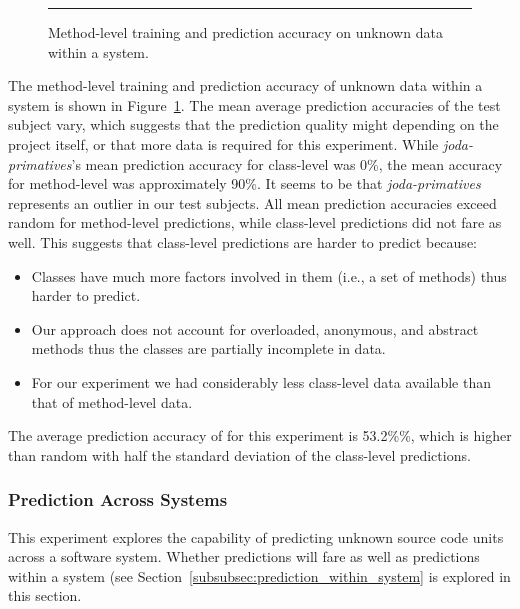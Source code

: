 \begin{figure}[!tb]
  \centering
  \begin{adjustbox}{max size={\textwidth}{\textheight}}
    
  \end{adjustbox}
  \caption{Method-level training and prediction accuracy on unknown data within a system.}
  \vspace{2mm}
  \hrule
  \label{fig:prediction_method_within_graph}
\end{figure}

The method-level training and prediction accuracy of unknown data within a system is shown in Figure~\ref{fig:prediction_method_within_graph}. The mean average prediction accuracies of the test subject vary, which suggests that the prediction quality might depending on the project itself, or that more data is required for this experiment. While \textit{joda-primatives}'s mean prediction accuracy for class-level was 0\%, the mean accuracy for method-level was approximately 90\%. It seems to be that \textit{joda-primatives} represents an outlier in our test subjects. All mean prediction accuracies exceed random for method-level predictions, while class-level predictions did not fare as well. This suggests that class-level predictions are harder to predict because:
\begin{itemize}
  \item Classes have much more factors involved in them (i.e., a set of methods) thus harder to predict.
  \item Our approach does not account for overloaded, anonymous, and abstract methods thus the classes are partially incomplete in data.
  \item For our experiment we had considerably less class-level data available than that of method-level data.
\end{itemize}
The average prediction accuracy of for this experiment is 53.2\%\%, which is higher than random with half the standard deviation of the class-level predictions.


\subsubsection{Prediction Across Systems}
\label{subsubsec:prediction_across_systems}
This experiment explores the capability of predicting unknown source code units across a software system. Whether predictions will fare as well as predictions within a system (see Section~\ref{subsubsec:prediction_within_system} is explored in this section.

